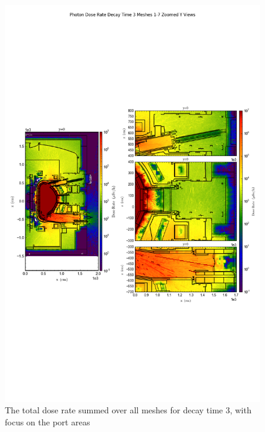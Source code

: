 \documentclass[12pt]{article}
\begin{document}
\begin{figure}[ht!]
\centering
\includegraphics[trim={0cm 9cm 0cm 10cm},clip,scale=0.75]{../plots/final_model/Photon_Dose_Rate_Decay_Time_3_Meshes_1-7_Zoomed_Y_Views.png}
\caption{The total dose rate summed over all meshes for decay time 3, with focus on the port areas}
\label{fig:photons_dc3_no4bc_total_zoomed}
\end{figure}
\end{document}
